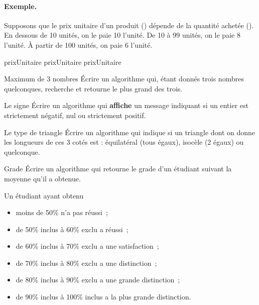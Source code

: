 \clearpage
	\begin{Emphase}
		\paragraph{Exemple.}
		Supposons que le prix unitaire d'un produit ()
		dépende de la quantité achetée (). 
		En dessous de 10 unités, on le paie 10\texteuro{} l'unité.
		De 10 à 99 unités, on le paie 8\texteuro{} l'unité.
		À partir de 100 unités, on paie 6\texteuro{} l'unité.
		
		\begin{LDA}
				\Let prixUnitaire 
			 
				\Let prixUnitaire 
			\Else
				\Let prixUnitaire 
			\EndIf
		\end{LDA}
		
	\end{Emphase}
			
	\begin{Exercice}{Maximum de 3 nombres}
		Écrire un algorithme qui, étant donnés trois nombres quelconques,
		recherche et retourne le plus grand des trois.
	\end{Exercice}
	
	\begin{Exercice}{Le signe}
		Écrire un algorithme qui \textbf{affiche} un message indiquant
		si un entier est strictement négatif, nul ou strictement
		positif.
	\end{Exercice}

	\begin{Exercice}{Le type de triangle}
		Écrire un algorithme qui indique si un triangle
		dont on donne les longueurs de ces 3 cotés est :
		équilatéral (tous égaux), isocèle (2 égaux)
		ou quelconque.
	\end{Exercice}

	\begin{Exercice}{Grade}
		Écrire un algorithme qui retourne le grade d'un étudiant 
		suivant la moyenne qu'il a obtenue.
		
		Un étudiant ayant obtenu 
		\begin{itemize}
			\item moins de 50\% n'a pas réussi~;
			\item de 50\% inclus à 60\% exclu a réussi~;
			\item de 60\% inclus à 70\% exclu a une satisfaction~;
			\item de 70\% inclus à 80\% exclu a une distinction~;
			\item de 80\% inclus à 90\% exclu a une grande distinction~;
			\item de 90\% inclus à 100\% inclus a la plus grande distinction.
		\end{itemize}
	\end{Exercice}


